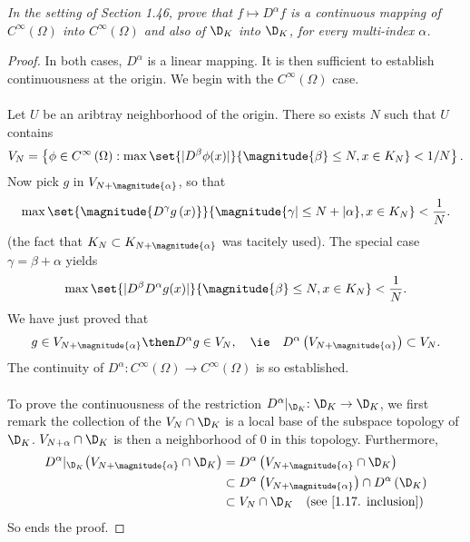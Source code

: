 \textit{In the setting of Section 1.46, prove that 
    $f \mapsto D^{\alpha}f$ 
is a continuous mapping of 
%
  $C^{\infty}\left(\Omega\right)$ into 
  $C^{\infty}\left(\Omega\right)$ and also of 
  $\D_{K}$ into 
  $\D_{K}$, for every multi-index $\alpha$.
%
}
\begin{proof} 
In both cases, $D^\alpha$ is a linear mapping. 
It is then sufficient to establish continuousness at the origin.
%
We begin with the $C^\infty\left(\Omega\right)$ case. \\
\\
Let $U$ be an aribtray neighborhood of the origin.
There so exists $N$ such that $U$ contains
%
  \begin{align} 
    V_{N}= \left\{
      \phi \in C^\infty\left(\Omega\right): 
      \max\set{
        | D^\beta\phi (x) |
      }{
        \magnitude{ \beta } \leq N, x\in K_N
      }
    < 1/N
    \right\}.
  \end{align}
%
Now pick $g$ in $V_{N+\magnitude{\alpha}}$, so that
%
  \begin{align}
    \max
    \set{
      \magnitude{ D^\gamma g\left(x\right) }
    }{
      \magnitude{ \gamma | \leq N+| \alpha }, 
      x\in K_{N}
    }
    < \frac{1}{N}.
  \end{align}
%
(the fact that $K_N\subset K_{N+\magnitude{\alpha}}$ was tacitely used).
%
The special case $\gamma = \beta + \alpha$ yields
\begin{align}
    \max
    \set{
      | D^\beta D^\alpha g(x)|
    }{
      \magnitude{\beta} \leq N, 
      x\in K_{N}
    }
    < \frac{1}{N}.
  \end{align}
%
We have just proved that
%
  \begin{align}\label{1.17. inclusion}
    g \in V_{N + \magnitude{\alpha}}
      \then 
    D^\alpha g \in V_{N},
      \quad
      \ie
      \quad
    D^\alpha \left(V_{N+\magnitude{\alpha}}\right) \subset V_N.
  \end{align}
%
The continuity of 
  $D^{\alpha}: C^\infty \left(\Omega\right) \to C^\infty \left(\Omega\right)$ 
is so established. \\\\
%
%
To prove the continuousness of the restriction 
%
  $D^\alpha \lvert_{\D_K}: \D_K \to \D_K$, %
%
%
we first remark the collection of the  
%
  ${V_N \cap \D_K}$ %
%
is a local base of the subspace topology of $\D_K$.
%
%
  $V_{N+\alpha} \cap \D_K$ %
%
is then a neighborhood of $0$ in this topology. %
Furthermore, 
%
  \begin{align}
    D^\alpha \lvert_{\D_K} \left(V_{N+\magnitude{\alpha}} \cap \D_K\right) 
    & = 
      D^\alpha\left(V_{N+\magnitude{\alpha}} \cap \D_K\right) \\
    & \subset
      D^\alpha\left(V_{N+\magnitude{\alpha}}\right) 
        \cap 
      D^\alpha\left(\D_K\right) \\
    & \subset 
      V_N 
        \cap 
      \D_K
          \quad (\text{see }\ref{1.17. inclusion})
  \end{align}
%
So ends the proof.
\end{proof}

